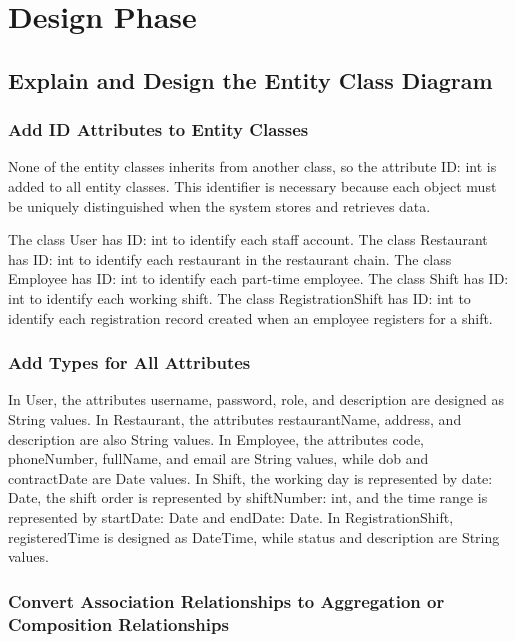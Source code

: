 \chapter{Design Phase}

\section{Explain and Design the Entity Class Diagram}

\subsection{Add ID Attributes to Entity Classes}

None of the entity classes inherits from another class, so the attribute ID: int is added to all entity classes. This identifier is necessary because each object must be uniquely distinguished when the system stores and retrieves data.

The class User has ID: int to identify each staff account. The class Restaurant has ID: int to identify each restaurant in the restaurant chain. The class Employee has ID: int to identify each part-time employee. The class Shift has ID: int to identify each working shift. The class RegistrationShift has ID: int to identify each registration record created when an employee registers for a shift.

\subsection{Add Types for All Attributes}


In User, the attributes username, password, role, and description are designed as String values. In Restaurant, the attributes restaurantName, address, and description are also String values. In Employee, the attributes code, phoneNumber, fullName, and email are String values, while dob and contractDate are Date values. In Shift, the working day is represented by date: Date, the shift order is represented by shiftNumber: int, and the time range is represented by startDate: Date and endDate: Date. In RegistrationShift, registeredTime is designed as DateTime, while status and description are String values.

\subsection{Convert Association Relationships to Aggregation or \\ Composition Relationships}




